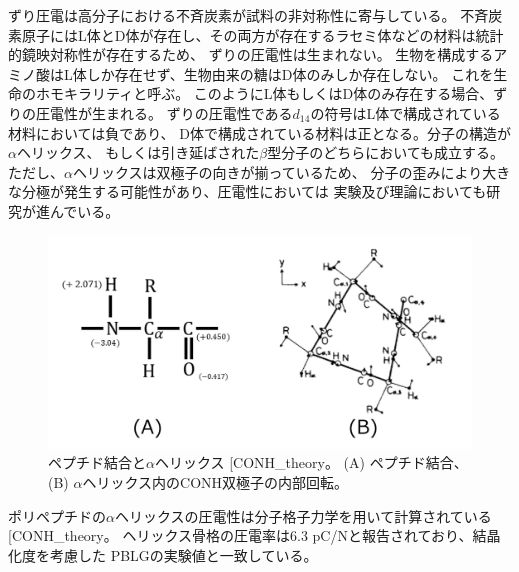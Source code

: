 \documentclass[dvipdfmx,12pt,a4paper]{jreport}
\makeatletter
\DeclareRobustCommand\cite{\unskip
    	\@ifnextchar[{\@tempswatrue\@citex}{\@tempswafalse\@citex[]}}
\makeatother
\begin{document}
			ずり圧電は高分子における不斉炭素が試料の非対称性に寄与している。
			不斉炭素原子にはL体とD体が存在し、その両方が存在するラセミ体などの材料は統計的鏡映対称性が存在するため、
			ずりの圧電性は生まれない。
			生物を構成するアミノ酸はL体しか存在せず、生物由来の糖はD体のみしか存在しない。
			これを生命のホモキラリティと呼ぶ。
			このようにL体もしくはD体のみ存在する場合、ずりの圧電性が生まれる。
			ずりの圧電性である$d_{14}$の符号はL体で構成されている材料においては負であり、
			D体で構成されている材料は正となる。分子の構造が$\alpha$ヘリックス、
			もしくは引き延ばされた$\beta$型分子のどちらにおいても成立する。
			ただし、$\alpha$ヘリックスは双極子の向きが揃っているため、
			分子の歪みにより大きな分極が発生する可能性があり、圧電性においては
			実験及び理論においても研究が進んでいる。
			\begin{figure}[h]
				\centering
				\includegraphics[scale=0.8]{アルファヘリックス_CONH.jpg}
				\caption{ペプチド結合と$\alpha$ヘリックス\cite{CONH_theory}。
				(A) ペプチド結合、(B) $\alpha$ヘリックス内のCONH双極子の内部回転。}
				\label{アルファヘリックス}
			\end{figure}
			ポリペプチドの$\alpha$ヘリックスの圧電性は分子格子力学を用いて計算されている\cite{CONH_theory}。
			ヘリックス骨格の圧電率は$6.3$ pC/Nと報告されており、結晶化度を考慮した
			PBLGの実験値と一致している。
			
\end{document}
